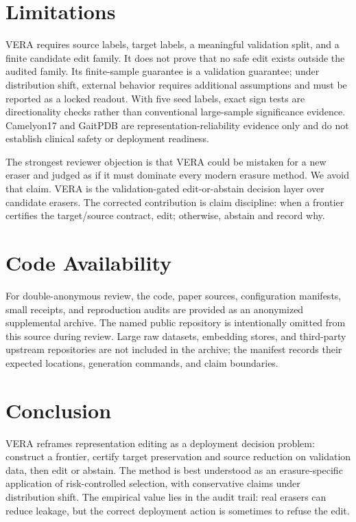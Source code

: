 \documentclass[letterpaper]{article}
\begin{document}
\section{Limitations}

VERA requires source labels, target labels, a meaningful validation split, and
a finite candidate edit family. It does not prove that no safe edit exists
outside the audited family. Its finite-sample guarantee is a validation
guarantee; under distribution shift, external behavior requires additional
assumptions and must be reported as a locked readout. With five seed labels,
exact sign tests are directionality checks rather than conventional
large-sample significance evidence. Camelyon17 and GaitPDB are
representation-reliability evidence only and do not establish clinical safety
or deployment readiness.

The strongest reviewer objection is that VERA could be mistaken for a new
eraser and judged as if it must dominate every modern erasure method. We avoid
that claim. VERA is the validation-gated edit-or-abstain decision layer over
candidate erasers. The corrected contribution is claim discipline: when a
frontier certifies the target/source contract, edit; otherwise, abstain and
record why.

\section{Code Availability}

For double-anonymous review, the code, paper sources, configuration manifests,
small receipts, and reproduction audits are provided as an anonymized
supplemental archive. The named public repository is intentionally omitted from
this source during review. Large raw datasets, embedding stores, and third-party
upstream repositories are not included in the archive; the manifest records
their expected locations, generation commands, and claim boundaries.

\section{Conclusion}

VERA reframes representation editing as a deployment decision problem:
construct a frontier, certify target preservation and source reduction on
validation data, then edit or abstain. The method is best understood as an
erasure-specific application of risk-controlled selection, with conservative
claims under distribution shift. The empirical value lies in the audit trail:
real erasers can reduce leakage, but the correct deployment action is sometimes
to refuse the edit.
\end{document}
